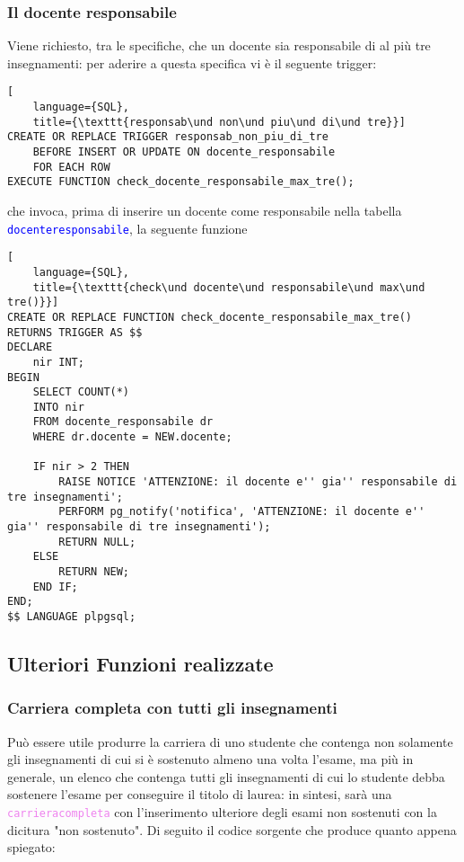 \documentclass{article}
\newcommand{\tabb}[1]{\texttt{\textcolor{blue}{#1}}}
\newcommand{\sqlfunc}[1]{\texttt{\textcolor{violet}{#1}}}
\newcommand{\und}[0]{\textunderscore}
\begin{document}
\subsubsection{Il docente responsabile}
Viene richiesto, tra le specifiche, che un docente sia responsabile di al più tre insegnamenti: per aderire a questa specifica vi è il seguente trigger:

\begin{lstlisting}[
    language={SQL},
    title={\texttt{responsab\und non\und piu\und di\und tre}}]
CREATE OR REPLACE TRIGGER responsab_non_piu_di_tre
    BEFORE INSERT OR UPDATE ON docente_responsabile
    FOR EACH ROW
EXECUTE FUNCTION check_docente_responsabile_max_tre();
\end{lstlisting}

che invoca, prima di inserire un docente come responsabile nella tabella \tabb{docente\und responsabile}, la seguente funzione

\begin{lstlisting}[
    language={SQL},
    title={\texttt{check\und docente\und responsabile\und max\und tre()}}]
CREATE OR REPLACE FUNCTION check_docente_responsabile_max_tre() RETURNS TRIGGER AS $$
DECLARE
    nir INT;
BEGIN
    SELECT COUNT(*)
    INTO nir
    FROM docente_responsabile dr
    WHERE dr.docente = NEW.docente;

    IF nir > 2 THEN
        RAISE NOTICE 'ATTENZIONE: il docente e'' gia'' responsabile di tre insegnamenti';
        PERFORM pg_notify('notifica', 'ATTENZIONE: il docente e'' gia'' responsabile di tre insegnamenti');
        RETURN NULL;
    ELSE
        RETURN NEW;
    END IF;
END;
$$ LANGUAGE plpgsql;
\end{lstlisting}

\subsection{Ulteriori Funzioni realizzate}
\subsubsection{Carriera completa con tutti gli insegnamenti}
Può essere utile produrre la carriera di uno studente che contenga non solamente gli insegnamenti di cui si è sostenuto almeno una volta l'esame, ma più in generale, un elenco che contenga tutti gli insegnamenti di cui lo studente debba sostenere l'esame per conseguire il titolo di laurea: in sintesi, sarà una \sqlfunc{carriera\und completa} con l'inserimento ulteriore degli esami non sostenuti con la dicitura "non sostenuto". Di seguito il codice sorgente che produce quanto appena spiegato:
\end{document}
